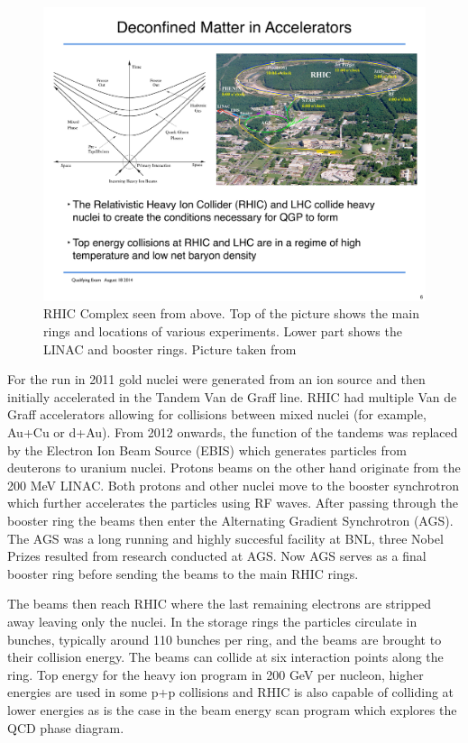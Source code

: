\begin{figure}[htbp]
\begin{center}
\includegraphics[scale=0.75]{Plots/Detector/RHIC_Complex.pdf}
\end{center}
\caption[RHIC Facility]{RHIC Complex seen from above. Top of the picture shows the main rings and locations of various experiments. Lower part shows the LINAC and booster rings. Picture taken from ~\cite{RHICpic}}
\label{fig:RHIC}
\end{figure}

For the run in 2011 gold nuclei were generated from an ion source and then initially accelerated in the Tandem Van de Graff line. RHIC had multiple Van de Graff accelerators allowing for collisions between mixed nuclei (for example, Au+Cu or d+Au). From 2012 onwards, the function of the tandems was replaced by the Electron Ion Beam Source (EBIS) which generates particles from deuterons to uranium nuclei. Protons beams on the other hand originate from the 200 MeV LINAC. Both protons and other nuclei move to the booster synchrotron which further accelerates the particles using RF waves. After passing through the booster ring the beams then enter the Alternating Gradient Synchrotron (AGS). The AGS was a long running and highly succesful facility at BNL, three Nobel Prizes resulted from research conducted at AGS. Now AGS serves as a final booster ring before sending the beams to the main RHIC rings. 

The beams then reach RHIC where the last remaining electrons are stripped away leaving only the nuclei. In the storage rings the particles circulate in bunches, typically around 110 bunches per ring, and the beams are brought to their collision energy. The beams can collide at six interaction points along the ring. Top energy for the heavy ion program in 200 GeV per nucleon, higher energies are used in some p+p collisions and RHIC is also capable of colliding at lower energies as is the case in the beam energy scan program which explores the QCD phase diagram.

